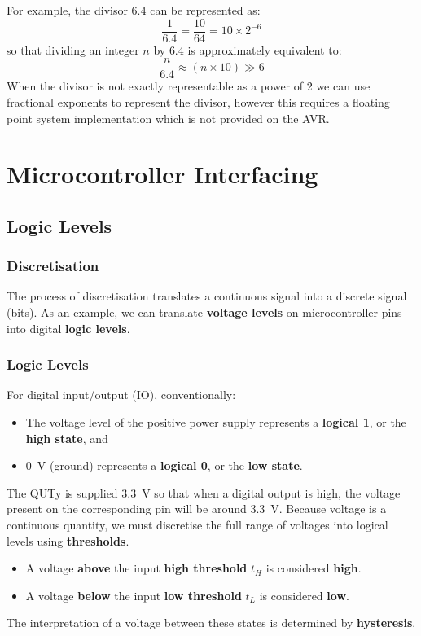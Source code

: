 \documentclass[a4paper]{report}
\begin{document}
For example, the divisor \(6.4\) can be represented as:
\begin{equation*}
    \frac{1}{6.4} = \frac{10}{64} = 10 \times 2^{-6}
\end{equation*}
so that dividing an integer \(n\) by \(6.4\) is approximately equivalent to:
\begin{equation*}
    \frac{n}{6.4} \approx \left( n \times 10 \right) \gg 6
\end{equation*}
When the divisor is not exactly representable as a power of 2 we can use fractional
exponents to represent the divisor, however this requires a floating point
system implementation which is not provided on the AVR\@.
\chapter{Microcontroller Interfacing}
\section{Logic Levels}
\subsection{Discretisation}
The process of discretisation translates a continuous signal into a
discrete signal (bits). As an example, we can translate \textbf{voltage
levels} on microcontroller pins into digital \textbf{logic levels}.
\subsection{Logic Levels}
For digital input/output (IO), conventionally:
\begin{itemize}
    \item The voltage level of the positive power supply represents a
          \textbf{logical 1}, or the \textbf{high state}, and
    \item \qty{0}{V} (ground) represents a \textbf{logical 0}, or the \textbf{low state}.
\end{itemize}
The QUTy is supplied \qty{3.3}{V} so that when a digital output is high,
the voltage present on the corresponding pin will be around \qty{3.3}{V}.
Because voltage is a continuous quantity, we must discretise the full range of voltages into logical levels using \textbf{thresholds}.
\begin{itemize}
    \item A voltage \textbf{above} the input \textbf{high threshold}
          \(t_H\) is considered \textbf{high}.
    \item A voltage \textbf{below} the input \textbf{low threshold}
          \(t_L\) is considered \textbf{low}.
\end{itemize}
The interpretation of a voltage between these states is determined by \textbf{hysteresis}.
\end{document}
